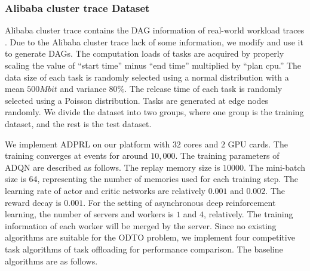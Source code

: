 \documentclass[10pt, conference, letterpaper]{IEEEtran}
\begin{document}
\subsubsection{Alibaba cluster trace Dataset} Alibaba cluster trace contains the DAG information of real-world workload traces \cite{Alidata}. Due to the Alibaba cluster trace lack of some information, we modify and use it to generate DAGs. The computation loads of tasks are acquired by properly scaling the value of ``start time'' minus ``end time'' multiplied by ``plan cpu.'' The data size of each task is randomly selected using a normal distribution with a mean $500Mbit$ and variance $80\%$. The release time of each task is randomly selected using a Poisson distribution. Tasks are generated at edge nodes randomly. We divide the dataset into two groups, where one group is the training dataset, and the rest is the test dataset.

We implement ADPRL on our platform with $32$ cores and $2$ GPU cards. The training converges at events for around $10,000$. The training parameters of ADQN are described as follows. The replay memory size is $10000$. The mini-batch size is 64, representing the number of memories used for each training step. The learning rate of actor and critic networks are relatively $0.001$ and $0.002$. The reward decay is $0.001$. For the setting of asynchronous deep reinforcement learning, the number of servers and workers is $1$ and $4$, relatively. The training information of each worker will be merged by the server. Since no existing algorithms are suitable for the ODTO problem, we implement four competitive task algorithms of task offloading for performance comparison. The baseline algorithms are as follows. 

\end{document}
